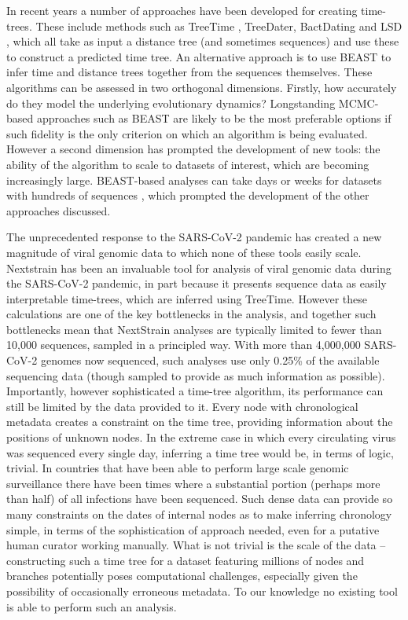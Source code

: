 In recent years a number of approaches have been developed for creating time-trees. These include methods such as TreeTime \cite{Sagulenko2018-kr}, TreeDater\cite{Volz2017-le},  BactDating \cite{Didelot2018-vf} and LSD \cite{To2016-cw} , which all take as input a distance tree (and sometimes sequences) and use these to construct a predicted time tree. An alternative approach is to use BEAST \cite{Suchard2018-ma} to infer time and distance trees together from the sequences themselves. These algorithms can be assessed in two orthogonal dimensions. Firstly, how accurately do they model the underlying evolutionary dynamics? Longstanding MCMC-based approaches such as BEAST are likely to be the most preferable options if such fidelity is the only criterion on which an algorithm is being evaluated. However a second dimension has prompted the development of new tools: the ability of the algorithm to scale to datasets of interest, which are becoming increasingly large. BEAST-based analyses can take days or weeks for datasets with hundreds of sequences \cite{Sagulenko2018-kr}, which prompted the development of the other approaches discussed.

The unprecedented response to the SARS-CoV-2 pandemic has created a new magnitude of viral genomic data to which none of these tools easily scale. Nextstrain \cite{Hadfield2018-fb} has been an invaluable tool for analysis of viral genomic data during the SARS-CoV-2 pandemic, in part because it presents sequence data as easily interpretable time-trees, which are inferred using TreeTime. However these calculations are one of the key bottlenecks in the analysis, and together such bottlenecks mean that NextStrain analyses are typically limited to fewer than 10,000 sequences, sampled in a principled way. With more than 4,000,000 SARS-CoV-2 genomes now sequenced, such analyses use only 0.25\% of the available sequencing data (though sampled to provide as much information as possible). Importantly, however sophisticated a time-tree algorithm, its performance can still be limited by the data provided to it. Every node with chronological metadata creates a constraint on the time tree, providing information about the positions of unknown nodes. In the extreme case in which every circulating virus was sequenced every single day, inferring a time tree would be, in terms of logic, trivial. In countries that have been able to perform large scale genomic surveillance there have been times where a substantial portion (perhaps more than half) of all infections have been sequenced. Such dense data can provide so many constraints on the dates of internal nodes as to make inferring chronology simple, in terms of the sophistication of approach needed, even for a putative human curator working manually. What is not trivial is the scale of the data -- constructing such a time tree for a dataset featuring millions of nodes and branches potentially poses computational challenges, especially given the possibility of occasionally erroneous metadata. To our knowledge no existing tool is able to perform such an analysis.

